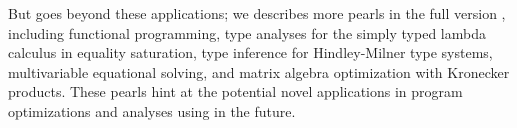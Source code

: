 But \egglog goes beyond these applications;
 we
 describes more \egglog pearls in the full version \citep{egglog-preprint},
 including functional programming,
 type analyses for the simply typed lambda calculus in equality saturation,
 type inference for Hindley-Milner type systems,
 multivariable equational solving,
 and matrix algebra optimization with Kronecker products.
These pearls hint at the potential novel applications in program optimizations and analyses using \egglog in the future.


